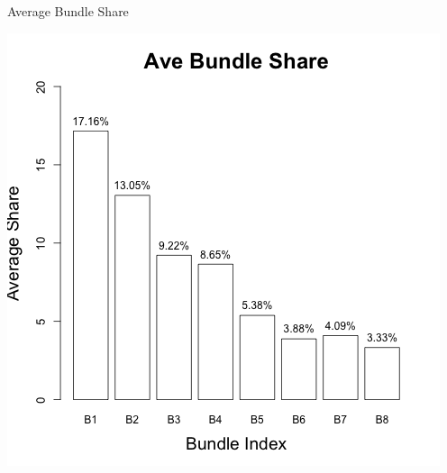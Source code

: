 \documentclass[xcolor=dvipsnames,12pt]{beamer}
\theoremstyle{definition}
\begin{document}
\begin{frame}{Average Bundle Share}
	\graphicspath{ {./graph_share/} }
	\centering
	\includegraphics[scale=0.48]{Avg_Bundle_Share2}
\end{frame}

{
\begin{center}



%
\end{center}
}
\end{document}
